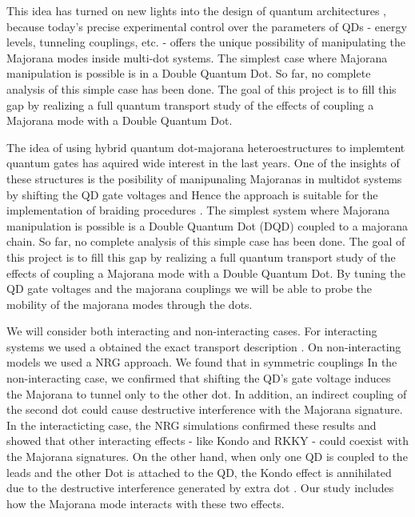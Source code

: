 \documentclass[showpacs,aps,prb,reprint,superscriptaddress]{revtex4-1}
\begin{document}
This idea has turned on new lights into the design of quantum architectures \cite{barkeshli_physical_2015,karzig_scalable_2017} , because today’s precise experimental control over the parameters of QDs - energy levels, tunneling couplings, etc. - offers the unique possibility of manipulating the Majorana modes inside multi-dot systems. The simplest case where Majorana manipulation is possible is in a Double Quantum Dot. So far, no complete analysis of this simple case has been done. The goal of this  project is to fill this gap by realizing a full quantum transport study of the effects of coupling a Majorana mode with a Double Quantum Dot. 
 
 The idea of using hybrid quantum dot-majorana heteroestructures to implemtent quantum gates has aquired wide interest in the last years.  One of the insights of these structures is the posibility of manipunaling  Majoranas  in multidot systems by shifting the QD gate voltages and Hence the approach is suitable for the implementation of braiding procedures . The simplest system where Majorana manipulation is possible is  a  Double Quantum Dot (DQD) coupled to a majorana chain. So far, no complete analysis of this simple case has been done. The goal of this  project is to fill this gap by realizing a full quantum transport study of the effects of coupling a Majorana mode with a Double Quantum Dot. By tuning the QD gate voltages and the majorana couplings we will be able to probe the mobility of the majorana modes through the dots. 
 
 
  We will consider both interacting and non-interacting cases. For interacting systems we used a obtained the exact transport description . On non-interacting models we used a NRG approach.   We found that in symmetric couplings  In the non-interacting case, we confirmed that shifting the QD’s gate voltage induces the Majorana to tunnel only to the other dot. In addition, an indirect coupling of the second dot could cause destructive interference with the Majorana signature. In the interacticting case,  the NRG simulations confirmed these results and showed that other interacting effects - like Kondo and RKKY \cite{ruderman_indirect_1954,kasuya_theory_1956,yosida_magnetic_1957} - could coexist with the Majorana signatures. On the other hand, when only one QD is coupled to the leads and the other Dot is attached to the QD,  the Kondo effect is annihilated due to the destructive interference  generated by extra dot \cite{dias_da_silva_transmission_2008}. Our study includes how the Majorana mode interacts with these two effects.  
 
\end{document}
